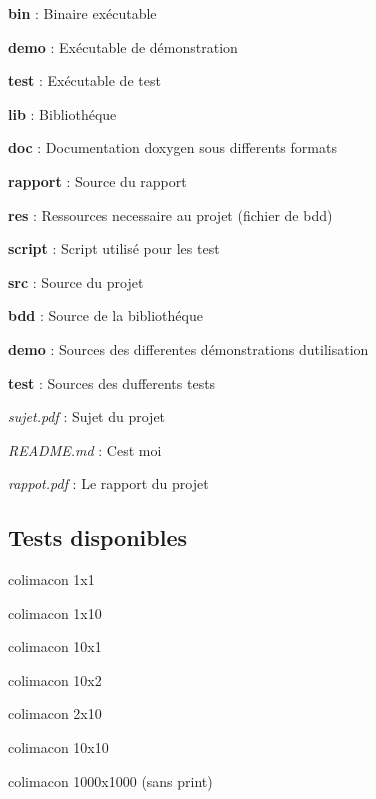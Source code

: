\begin{DoxyItemize}
\item {\bfseries bin} \+: Binaire exécutable
\begin{DoxyItemize}
\item {\bfseries demo} \+: Exécutable de démonstration
\item {\bfseries test} \+: Exécutable de test
\end{DoxyItemize}
\item {\bfseries lib} \+: Bibliothéque
\item {\bfseries doc} \+: Documentation doxygen sous differents formats
\item {\bfseries rapport} \+: Source du rapport
\item {\bfseries res} \+: Ressources necessaire au projet (fichier de bdd)
\item {\bfseries script} \+: Script utilisé pour les test
\item {\bfseries src} \+: Source du projet
\begin{DoxyItemize}
\item {\bfseries bdd} \+: Source de la bibliothéque
\item {\bfseries demo} \+: Sources des differentes démonstrations d\textquotesingle{}utilisation
\item {\bfseries test} \+: Sources des dufferents tests
\end{DoxyItemize}
\item {\itshape sujet.\+pdf} \+: Sujet du projet
\item {\itshape R\+E\+A\+D\+M\+E.\+md} \+: C\textquotesingle{}est moi
\item {\itshape rappot.\+pdf} \+: Le rapport du projet
\end{DoxyItemize}

\subsection*{Tests disponibles}


\begin{DoxyItemize}
\item colimacon 1x1
\item colimacon 1x10
\item colimacon 10x1
\item colimacon 10x2
\item colimacon 2x10
\item colimacon 10x10
\item colimacon 1000x1000 (sans print) 
\end{DoxyItemize}
